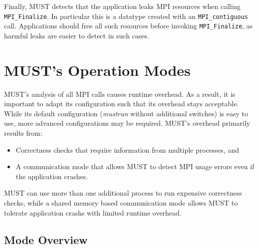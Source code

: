 \documentclass[english]{scrartcl}
\begin{document}

Finally, MUST detects that the application leaks MPI resources when calling
\texttt{MPI\_Finalize}. In particular
this is a datatype created with an \texttt{MPI\_contiguous} call. Applications
should free all such resources before invoking \texttt{MPI\_Finalize}, as
harmful leaks are easier to detect
in such cases.

\section{MUST's Operation Modes}
\label{section:must-modes}

MUST's analysis of all MPI calls causes runtime overhead. As a result, it is
important to adapt its configuration such that its overhead stays acceptable.
While its default configuration (\emph{mustrun} without additional switches) is
easy to use, more advanced configurations may be required. MUST's overhead
primarily results from:
\begin{itemize}
  \item Correctness checks that require information from multiple processes, and
  \item A communication mode that allows MUST to detect MPI usage errors even if
  the application crashes. 
\end{itemize}

MUST can use more than one additional process to run expensive correctness
checks, while a shared memory based communication mode allows MUST to tolerate
application crashs with limited runtime overhead.

\subsection{Mode Overview}
\end{document}
